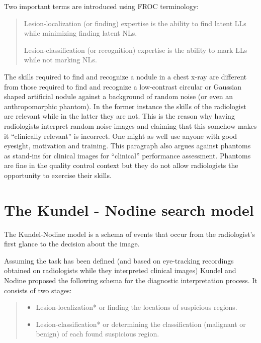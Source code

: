\documentclass[
]{book}
\providecommand{\tightlist}{%
  \setlength{\itemsep}{0pt}\setlength{\parskip}{0pt}}
\begin{document}
Two important terms are introduced using FROC terminology:

\begin{quote}
Lesion-localization (or finding) expertise is the ability to find latent LLs while minimizing finding latent NLs.

Lesion-classification (or recognition) expertise is the ability to mark LLs while not marking NLs.
\end{quote}

The skills required to find and recognize a nodule in a chest x-ray are different from those required to find and recognize a low-contrast circular or Gaussian shaped artificial nodule against a background of random noise (or even an anthropomorphic phantom). In the former instance the skills of the radiologist are relevant while in the latter they are not. This is the reason why having radiologists interpret random noise images and claiming that this somehow makes it ``clinically relevant'' is incorrect. One might as well use anyone with good eyesight, motivation and training. This paragraph also argues against phantoms as stand-ins for clinical images for ``clinical'' performance assessment. Phantoms are fine in the quality control context but they do not allow radiologists the opportunity to exercise their skills.

\hypertarget{visual-search-kundel-nodine-model}{%
\section{The Kundel - Nodine search model}\label{visual-search-kundel-nodine-model}}

The Kundel-Nodine model \citep{kundel2007holistic, kundel2004modeling} is a schema of events that occur from the radiologist's first glance to the decision about the image.

Assuming the task has been defined (and based on eye-tracking recordings obtained on radiologists while they interpreted clinical images) Kundel and Nodine proposed the following schema for the diagnostic interpretation process. It consists of two stages:

\begin{quote}
\begin{itemize}
\tightlist
\item
  Lesion-localization* or finding the locations of suspicious regions.
\item
  Lesion-classification* or determining the classification (malignant or benign) of each found suspicious region.
\end{itemize}
\end{quote}
\end{document}
